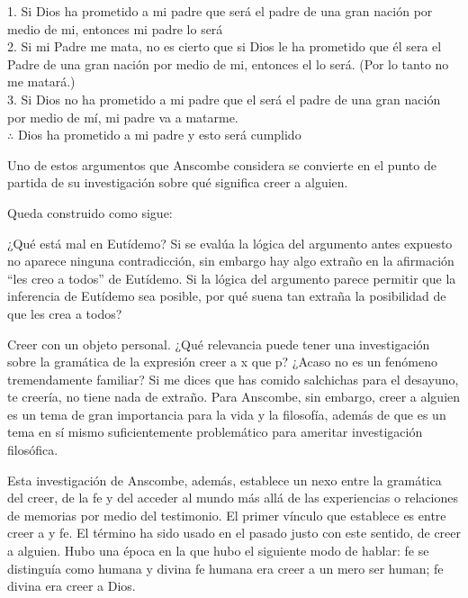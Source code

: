 \begin{adjustwidth}{1.2cm}{}
  1. Si Dios ha prometido a mi padre que será el padre de una gran nación por
  medio de mi, entonces mi padre lo será\\
  2. Si mi Padre me mata, no es cierto que si Dios le ha prometido que él sera
  el Padre de una gran nación por medio de mi, entonces el lo será.
  (Por lo tanto no me matará.)\\
  3. Si Dios no ha prometido a mi padre que el será el padre de una gran nación
  por medio de mí, mi padre va a matarme.\\
  $\therefore$ Dios ha prometido a mi padre y esto será cumplido\\
\end{adjustwidth}

Uno de estos argumentos que Anscombe considera se convierte en el
punto de partida de su investigación sobre qué significa creer a alguien.

Queda construido como
sigue: 

¿Qué está mal en Eutídemo? Si se evalúa la lógica del argumento antes expuesto
no aparece ninguna contradicción, sin embargo hay algo extraño en la afirmación
``les creo a todos'' de Eutídemo. Si la lógica del argumento parece permitir que
la inferencia de Eutídemo sea posible, por qué suena tan extraña la posibilidad
de que les crea a todos?

Creer con un objeto personal.
¿Qué relevancia puede tener una investigación sobre la gramática de la expresión
creer a x que p? ¿Acaso no es un fenómeno tremendamente familiar? Si me dices
que has comido salchichas para el desayuno, te creería, no tiene nada de
extraño. Para Anscombe, sin embargo, creer a alguien es un tema de gran
importancia para la vida y la filosofía, además de que es un tema en sí mismo
suficientemente problemático para ameritar investigación filosófica.

Esta investigación de Anscombe, además, establece un nexo entre la gramática del
creer, de la fe y del acceder al mundo más allá de las experiencias o relaciones
de memorias por medio del testimonio.
El primer vínculo que establece es entre creer a y fe. 
El término ha sido usado en el pasado justo con este sentido, de creer a
alguien.
Hubo una época en la que hubo el siguiente modo de hablar:
fe se distinguía como humana y divina
fe humana era creer a un mero ser human;
fe divina era creer a Dios.

